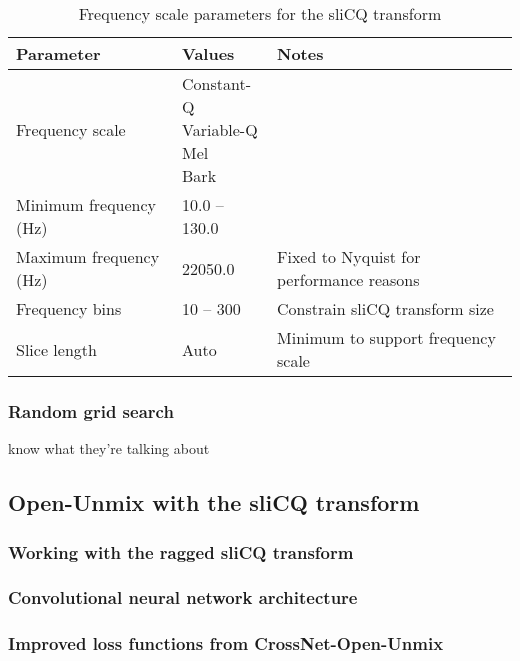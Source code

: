 \documentclass[report.tex]{subfiles}
\begin{document}
\begin{table}[ht]
	\centering
\begin{tabular}{ |l|l|l| }
	 \hline
	 Parameter & Values & Notes \\
	 \hline
	 \hline
	 Frequency scale & \makecell[l]{ Constant-Q \\ Variable-Q \\ Mel \\ Bark } & \\
	 \hline
	 Minimum frequency (Hz) & 10.0 -- 130.0 & \\
	 \hline
	 Maximum frequency (Hz) & 22050.0 & Fixed to Nyquist for performance reasons \\
	 \hline
	 Frequency bins & 10 -- 300 & Constrain sliCQ transform size \\
	 \hline
	 Slice length & Auto & Minimum to support frequency scale \\
	 \hline
\end{tabular}
	\caption{Frequency scale parameters for the sliCQ transform}
	\label{table:slicqfreqparam}
\end{table}

\subsubsection{Random grid search}

\textcite{randomgrid} know what they're talking about

\subsection{Open-Unmix with the sliCQ transform}



\subsubsection{Working with the ragged sliCQ transform}


\subsubsection{Convolutional neural network architecture}


\subsubsection{Improved loss functions from CrossNet-Open-Unmix}
\end{document}
